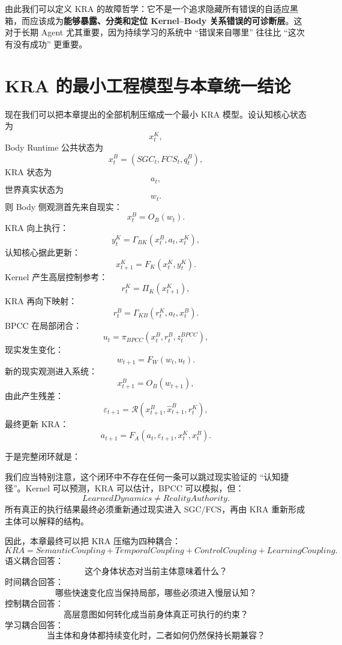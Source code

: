 由此我们可以定义 KRA 的故障哲学：它不是一个追求隐藏所有错误的自适应黑箱，而应该成为\textbf{能够暴露、分类和定位 Kernel--Body 关系错误的可诊断层}。这对于长期 Agent 尤其重要，因为持续学习的系统中 ``错误来自哪里'' 往往比 ``这次有没有成功'' 更重要。

\section{KRA 的最小工程模型与本章统一结论}
\label{sec:kra-minimal-model}

现在我们可以把本章提出的全部机制压缩成一个最小 KRA 模型。设认知核心状态为
\[
x^K_t,
\]
Body Runtime 公共状态为
\[
x^B_t
=
(SGC_t,FCS_t,q^B_t),
\]
KRA 状态为
\[
a_t,
\]
世界真实状态为
\[
w_t.
\]
则 Body 侧观测首先来自现实：
\[
x^B_t
=
O_B(w_t).
\]
KRA 向上执行：
\[
y^K_t
=
\Gamma_{BK}
\left(
x^B_t,
a_t,
x^K_t
\right),
\]
认知核心据此更新：
\[
x^K_{t+1}
=
F_K
\left(
x^K_t,
y^K_t
\right).
\]
Kernel 产生高层控制参考：
\[
r^K_t
=
\Pi_K(x^K_{t+1}),
\]
KRA 再向下映射：
\[
r^B_t
=
\Gamma_{KB}
\left(
r^K_t,
a_t,
x^B_t
\right).
\]
BPCC 在局部闭合：
\[
u_t
=
\pi_{BPCC}
\left(
x^B_t,
r^B_t,
z_t^{BPCC}
\right),
\]
现实发生变化：
\[
w_{t+1}
=
F_W(w_t,u_t).
\]
新的现实观测进入系统：
\[
x^B_{t+1}
=
O_B(w_{t+1}),
\]
由此产生残差：
\[
\varepsilon_{t+1}
=
\mathcal R
\left(
x^B_{t+1},
\hat x^B_{t+1},
r^K_t
\right),
\]
最终更新 KRA：
\[
a_{t+1}
=
F_A
\left(
a_t,
\varepsilon_{t+1},
x^K_t,
x^B_t
\right).
\]

于是完整闭环就是：
\begin{statementbox}
\centering
{}
\end{statementbox}

我们应当特别注意，这个闭环中不存在任何一条可以跳过现实验证的 ``认知捷径''。Kernel 可以预测，KRA 可以估计，BPCC 可以模拟，但：
\[
\boxed{
LearnedDynamics
\neq
RealityAuthority.
}
\]
所有真正的执行结果最终必须重新通过现实进入 SGC/FCS，再由 KRA 重新形成主体可以解释的结构。

因此，本章最终可以把 KRA 压缩为四种耦合：
\[
\boxed{
KRA
=
SemanticCoupling
+
TemporalCoupling
+
ControlCoupling
+
LearningCoupling.
}
\]
语义耦合回答：
\[
\text{这个身体状态对当前主体意味着什么？}
\]
时间耦合回答：
\[
\text{哪些快速变化应当保持局部，哪些必须进入慢层认知？}
\]
控制耦合回答：
\[
\text{高层意图如何转化成当前身体真正可执行的约束？}
\]
学习耦合回答：
\[
\text{当主体和身体都持续变化时，二者如何仍然保持长期兼容？}
\]

